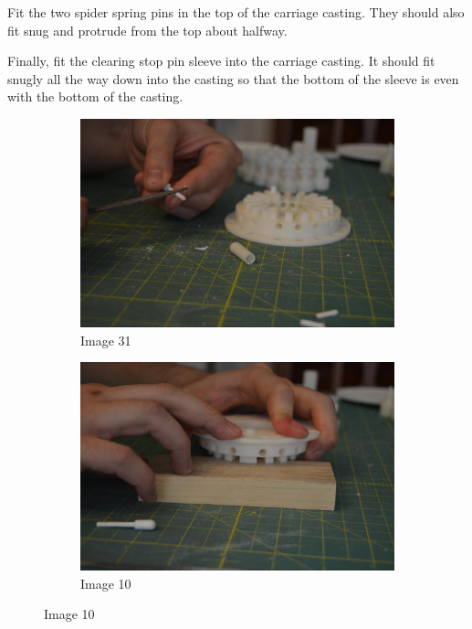 \documentclass[openany]{book}
\begin{document}
Fit the two spider spring pins in the top of the carriage casting. They should also fit snug and protrude from the top about halfway.

Finally, fit the clearing stop pin sleeve into the carriage casting. It should fit snugly all the way down into the casting so that the bottom of the sleeve is even with the bottom of the casting.

\begin{figure}[!ht]
	\centering
	\begin{subfigure}{.4\textwidth}
		\centering
		\includegraphics[width=.95\textwidth]{images/image31.jpg}
		\caption{Image 31}
		\label{fig:image31}	
	\end{subfigure}
	\begin{subfigure}{.4\textwidth}
		\centering
		\includegraphics[width=.95\textwidth]{images/image10.jpg}
		\caption{Image 10}
		\label{fig:image10}	
	\end{subfigure}
\end{figure}
\end{document}
